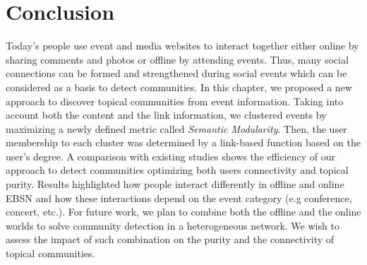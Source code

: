 \section{Conclusion}   \label{sec:conclusion}
Today's people use event and media websites to interact together either online by sharing comments and photos or offline by attending events. Thus, many social connections can be formed and strengthened during social events which can be considered as a basis to detect communities. In this chapter, we proposed a new approach to discover topical communities from event information. Taking into account both the content and the link information, we clustered events by maximizing a newly defined metric called \emph{Semantic Modularity}. Then, the user membership to each cluster was determined by a link-based function based on the user's degree. A comparison with existing studies shows the efficiency of our approach to detect communities optimizing both users connectivity and topical purity. Results highlighted how people interact differently in offline and online EBSN and how these interactions depend on the event category (e.g conference, concert, etc.). For future work, we plan to combine both the offline and the online worlds to solve community detection in a heterogeneous network. We wish to assess the impact of such combination on the purity and the connectivity of topical communities.